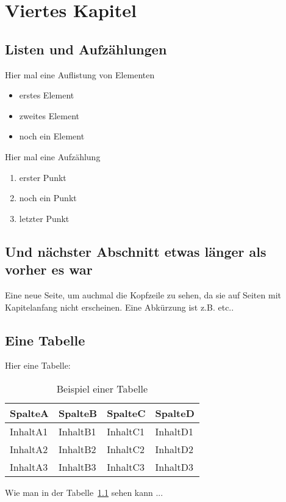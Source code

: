 \chapter{Viertes Kapitel}
\section{Listen und Aufz\"ahlungen}

Hier mal eine Auflistung von Elementen
\begin{itemize}
 \item erstes Element
 \item zweites Element
 \item noch ein Element
\end{itemize}

Hier mal eine Aufz\"ahlung
\begin{enumerate}
 \item erster Punkt
 \item noch ein Punkt
 \item letzter Punkt
\end{enumerate}

\section{Und n\"achster Abschnitt etwas l\"anger als vorher es war}
Eine neue Seite, um auchmal die Kopfzeile zu sehen, da sie auf Seiten mit Kapitelanfang nicht erscheinen. Eine Abk\"urzung ist z.B. etc..

\section{Eine Tabelle}

Hier eine Tabelle:
\begin{table}[htbp]
\centering
\begin{tabular}{l|l|l|l}
SpalteA & SpalteB & SpalteC & SpalteD \\
\midrule
InhaltA1 & InhaltB1 & InhaltC1 & InhaltD1 \\
InhaltA2 & InhaltB2 & InhaltC2 & InhaltD2 \\
InhaltA3 & InhaltB3 & InhaltC3 & InhaltD3
\end{tabular}
\caption{Beispiel einer Tabelle}
\label{tab:tabelle1}
\end{table}

Wie man in der Tabelle~\ref{tab:tabelle1} sehen kann ...

